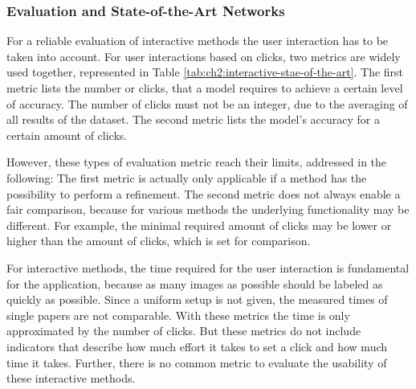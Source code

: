 \subsubsection{Evaluation and State-of-the-Art Networks} \label{ch2:sec3:eval_interactive_methods}
For a reliable evaluation of interactive methods the user interaction has to be taken into account.
For user interactions based on clicks, two metrics are widely used together, represented in Table \ref{tab:ch2:interactive-stae-of-the-art}. 
The first metric lists the number or clicks, that a model requires to achieve a certain level of accuracy. 
The number of clicks must not be an integer, due to the averaging of all results of the dataset.
The second metric lists the model's accuracy for a certain amount of clicks.

However, these types of evaluation metric reach their limits, addressed in the following:
The first metric is actually only applicable if a method has the possibility to perform a refinement.
The second metric does not always enable a fair comparison, because for various methods the underlying functionality may be different. 
For example, the minimal required amount of clicks may be lower or higher than the amount of clicks, which is set for comparison.

For interactive methods, the time required for the user interaction is fundamental for the application, because as many images as possible should be labeled as quickly as possible.
Since a uniform setup is not given, the measured times of single papers are not comparable.
With these metrics the time is only approximated by the number of clicks.
But these metrics do not include indicators that describe how much effort it takes to set a click and how much time it takes.
Further, there is no common metric to evaluate the usability of these interactive methods.

